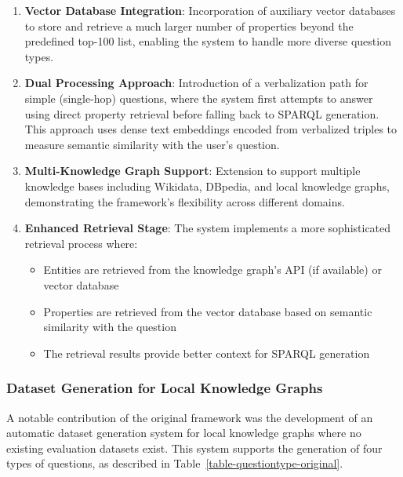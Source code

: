 \begin{enumerate}
    \item \textbf{Vector Database Integration}: Incorporation of auxiliary vector databases to store and retrieve a much larger number of properties beyond the predefined top-100 list, enabling the system to handle more diverse question types.
    
    \item \textbf{Dual Processing Approach}: Introduction of a verbalization path for simple (single-hop) questions, where the system first attempts to answer using direct property retrieval before falling back to SPARQL generation. This approach uses dense text embeddings encoded from verbalized triples to measure semantic similarity with the user's question.
    
    \item \textbf{Multi-Knowledge Graph Support}: Extension to support multiple knowledge bases including Wikidata, DBpedia, and local knowledge graphs, demonstrating the framework's flexibility across different domains.
    
    \item \textbf{Enhanced Retrieval Stage}: The system implements a more sophisticated retrieval process where:
    \begin{itemize}
        \item Entities are retrieved from the knowledge graph's API (if available) or vector database
        \item Properties are retrieved from the vector database based on semantic similarity with the question
        \item The retrieval results provide better context for SPARQL generation
    \end{itemize}
\end{enumerate}

\subsubsection{Dataset Generation for Local Knowledge Graphs}

A notable contribution of the original framework was the development of an automatic dataset generation system for local knowledge graphs where no existing evaluation datasets exist. This system supports the generation of four types of questions, as described in Table~\ref{table-questiontype-original}.

